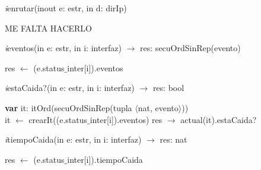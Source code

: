 \vspace{11pt}

\textit{i}enrutar(inout e: estr, in d: dirIp)\\
\begin{algorithm}[H]
\BlankLine
ME FALTA HACERLO
\end{algorithm}

\vspace{11pt}

\textit{i}eventos(in e: estr, in i: interfaz) $\longrightarrow$ res: secuOrdSinRep(evento)\\
\begin{algorithm}[H]
\BlankLine
res $\leftarrow$ (e.status$\_$inter[i]).eventos
\end{algorithm}

\vspace{11pt}

\textit{i}estaCaida?(in e: estr, in i: interfaz) $\longrightarrow$ res: bool\\
\begin{algorithm}[H]
\BlankLine
\textbf{var} it: itOrd(secuOrdSinRep(tupla $\langle$nat, evento$\rangle$)) \\
\BlankLine
it $\leftarrow$ crearIt((e.status$\_$inter[i]).eventos) 
\BlankLine
res $\rightarrow$ actual(it).estaCaida? 
\end{algorithm}

\vspace{11pt}

\textit{i}tiempoCaida(in e: estr, in i: interfaz) $\longrightarrow$ res: nat \\
\begin{algorithm}[H]
\BlankLine
res $\leftarrow$ (e.status$\_$inter[i]).tiempoCaida 
\end{algorithm}